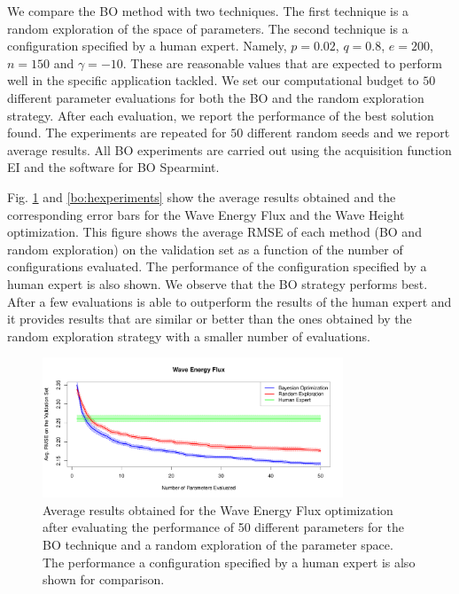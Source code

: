 We compare the BO method with two techniques. The first technique is a random exploration of
the space of parameters. The second technique is a configuration specified by a human
expert. Namely, $p=0.02$, $q=0.8$, $e=200$, $n=150$ and $\gamma = -10$. These are reasonable
values that are expected to perform well in the specific application tackled. We set our computational budget to $50$ different
parameter evaluations for both the BO and the random exploration strategy. After each
evaluation, we report the performance of the best solution found. The experiments are repeated
for $50$ different random seeds and we report average results. All BO experiments are carried out
using the acquisition function EI and the software for BO Spearmint.

Fig. \ref{bo:experiments} and \ref{bo:hexperiments} show the average results obtained and the corresponding error bars for the
Wave Energy Flux and the Wave Height optimization. This figure shows the average RMSE of each method (BO and random exploration) on the validation
set as a function of the number of configurations evaluated. The performance of the configuration
specified by a human expert is also shown. We observe that the BO strategy performs best.
After a few evaluations is able to outperform the results of the human expert
and it provides results that are similar or better than the ones obtained by the random
exploration strategy with a smaller number of evaluations.
\begin{figure}[!htb]
\centering
\includegraphics[width=0.8\textwidth]{Figures/alcala/bo.pdf}
\caption{\label{bo:experiments}
        Average results obtained for the Wave Energy Flux optimization
        after evaluating the performance of 50 different parameters for
        the BO technique and a random exploration of the parameter space. The performance a
        configuration specified by a human expert is also shown for comparison.
}
\end{figure}
